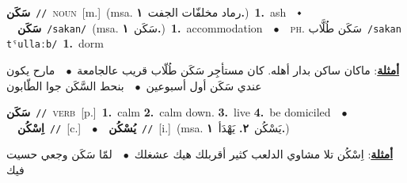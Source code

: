 \documentclass[10pt,a4paper,twoside]{article} %
\begin{document}
\begin{multicols}{2}
{\setlength\topsep{0pt}\textbf{\foreignlanguage{arabic}{سَكَن}}\ {\color{gray}\texttt{//}\color{black}}\ \textsc{noun}\ [m.]\ \color{gray}(msa. \foreignlanguage{arabic}{رماد مخلفّات الجفت}~\foreignlanguage{arabic}{\textbf{١.}})\color{black}\ \textbf{1.}~ash\ \ $\smblkdiamond$\ \ \setlength\topsep{0pt}\textbf{\foreignlanguage{arabic}{سَكَن}}\ {\color{gray}\texttt{/sakan/}\color{black}}\ \color{gray}(msa. \foreignlanguage{arabic}{سَكَن}~\foreignlanguage{arabic}{\textbf{١.}})\color{black}\ \textbf{1.}~accommodation\ \ $\bullet$\ \ \textsc{ph.} \color{gray} \foreignlanguage{arabic}{سَكَن طُلَّاب}\color{black}\ {\color{gray}\texttt{/{\sffamily sakan tˤullaːb}/}\color{black}}\ \textbf{1.}~dorm\  \begin{flushright}\color{gray}\foreignlanguage{arabic}{\textbf{\underline{\foreignlanguage{arabic}{أمثلة}}}: ماكان ساكن بدار أهله. كان مستأجِر سَكَن طُلّاب قريب عالجامعة\ $\bullet$\ \  مارح يكون عندي سَكَن أول أسبوعين\ $\bullet$\ \  بنحط السَّكَن جوا الطّابون}\end{flushright}\color{black}} \vspace{2mm}

{\setlength\topsep{0pt}\textbf{\foreignlanguage{arabic}{سَكَن}}\ {\color{gray}\texttt{//}\color{black}}\ \textsc{verb}\ [p.]\ \textbf{1.}~calm  \textbf{2.}~calm down.  \textbf{3.}~live  \textbf{4.}~be domiciled\ \ $\bullet$\ \ \setlength\topsep{0pt}\textbf{\foreignlanguage{arabic}{اِسْكُن}}\ {\color{gray}\texttt{//}\color{black}}\ [c.]\ \ $\bullet$\ \ \setlength\topsep{0pt}\textbf{\foreignlanguage{arabic}{يُسْكُن}}\ {\color{gray}\texttt{//}\color{black}}\ [i.]\ \color{gray}(msa. \foreignlanguage{arabic}{يَسْكُن}~\foreignlanguage{arabic}{\textbf{٢.}}  \foreignlanguage{arabic}{يَهْدَأ}~\foreignlanguage{arabic}{\textbf{١.}})\color{black}\  \begin{flushright}\color{gray}\foreignlanguage{arabic}{\textbf{\underline{\foreignlanguage{arabic}{أمثلة}}}: اِسْكُن تلا مشاوي الدلعب كثير أقربلك هيك عشغلك\ $\bullet$\ \  لمّا سَكَن وجعي حسيت فيك}\end{flushright}\color{black}} \vspace{2mm}


\end{multicols}
\end{document}
